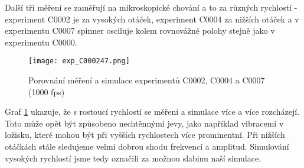 Další tři měření se zaměřují na mikroskopické chování a to za různých rychlostí - experiment C0002 je za vysokých otáček, experiment C0004 za nižších otáček a v experimentu C0007 spinner osciluje kolem rovnovážné polohy stejně jako v experimentu C0000.

\begin{figure}[!ht]
    \texttt{[image: exp\_C000247.png]}
    \centering
    \caption{Porovnání měření a simulace experimentů C0002, C0004 a C0007 (1000 fps)}
    \label{fig:exp_C000247}
\end{figure}

Graf \ref{fig:exp_C000247} ukazuje, že s rostoucí rychlostí se měření a simulace více a více rozcházejí. Toto může opět být způsobeno nechtěnnými jevy, jako například vibracemi v ložisku, které mohou být při vyšších rychlostech více prominentní. Při nižších otáčkách stále sledujeme velmi dobrou shodu frekvencí a amplitud. Simulování vysokých rychlostí jsme tedy označili za možnou slabinu naší simulace.